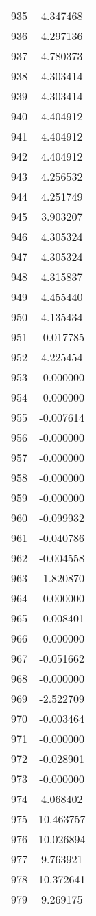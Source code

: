 \documentclass[12pt]{article}
\begin{document}
\begin{longtable}{@{}cc@{}}
935 & 4.347468 \\
936 & 4.297136 \\
937 & 4.780373 \\
938 & 4.303414 \\
939 & 4.303414 \\
940 & 4.404912 \\
941 & 4.404912 \\
942 & 4.404912 \\
943 & 4.256532 \\
944 & 4.251749 \\
945 & 3.903207 \\
946 & 4.305324 \\
947 & 4.305324 \\
948 & 4.315837 \\
949 & 4.455440 \\
950 & 4.135434 \\
951 & -0.017785 \\
952 & 4.225454 \\
953 & -0.000000 \\
954 & -0.000000 \\
955 & -0.007614 \\
956 & -0.000000 \\
957 & -0.000000 \\
958 & -0.000000 \\
959 & -0.000000 \\
960 & -0.099932 \\
961 & -0.040786 \\
962 & -0.004558 \\
963 & -1.820870 \\
964 & -0.000000 \\
965 & -0.008401 \\
966 & -0.000000 \\
967 & -0.051662 \\
968 & -0.000000 \\
969 & -2.522709 \\
970 & -0.003464 \\
971 & -0.000000 \\
972 & -0.028901 \\
973 & -0.000000 \\
974 & 4.068402 \\
975 & 10.463757 \\
976 & 10.026894 \\
977 & 9.763921 \\
978 & 10.372641 \\
979 & 9.269175 \\

\end{longtable}
\end{document}
